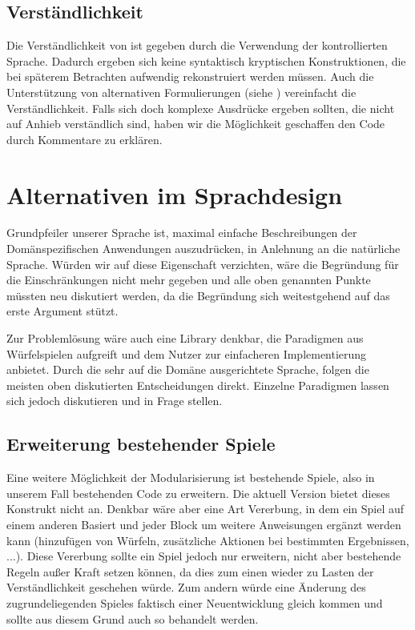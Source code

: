 \subsection{Verständlichkeit} %
\label{sub:verstandlichkeit}
	Die Verständlichkeit von \dg ist gegeben durch die Verwendung der kontrollierten Sprache. Dadurch ergeben sich keine syntaktisch kryptischen Konstruktionen, die bei späterem Betrachten aufwendig rekonstruiert werden müssen. Auch die Unterstützung von alternativen Formulierungen (siehe ) vereinfacht die Verständlichkeit. Falls sich doch komplexe Ausdrücke ergeben sollten, die nicht auf Anhieb verständlich sind, haben wir die Möglichkeit geschaffen den Code durch Kommentare zu erklären.


\section{Alternativen im Sprachdesign} %
\label{sec:alternativen_im_sprachdesign} 

Grundpfeiler unserer Sprache ist, maximal einfache Beschreibungen der Domänspezifischen Anwendungen auszudrücken, in Anlehnung an die natürliche Sprache. Würden wir auf diese Eigenschaft verzichten, wäre die Begründung für die Einschränkungen nicht mehr gegeben und alle oben genannten Punkte müssten neu diskutiert werden, da die Begründung sich weitestgehend auf das erste Argument stützt. 

Zur Problemlösung wäre auch eine Library denkbar, die Paradigmen aus Würfelspielen aufgreift und dem Nutzer zur einfacheren Implementierung anbietet. Durch die sehr auf die Domäne ausgerichtete Sprache, folgen die meisten oben diskutierten Entscheidungen direkt. Einzelne Paradigmen lassen sich jedoch diskutieren und in Frage stellen.

\subsection{Erweiterung bestehender Spiele}
\label{sub:erweiterung_bestehender_spiele}
	Eine weitere Möglichkeit der Modularisierung ist bestehende Spiele, also in unserem Fall bestehenden Code zu erweitern. Die aktuell \dg Version bietet dieses Konstrukt nicht an. Denkbar wäre aber eine Art Vererbung, in dem ein Spiel auf einem anderen Basiert und jeder Block um weitere Anweisungen ergänzt werden kann (hinzufügen von Würfeln, zusätzliche Aktionen bei bestimmten Ergebnissen, ...). Diese Vererbung sollte ein Spiel jedoch nur erweitern, nicht aber bestehende Regeln außer Kraft setzen können, da dies zum einen wieder zu Lasten der Verständlichkeit geschehen würde. Zum andern würde eine Änderung des zugrundeliegenden Spieles faktisch einer Neuentwicklung gleich kommen und sollte aus diesem Grund auch so behandelt werden.

